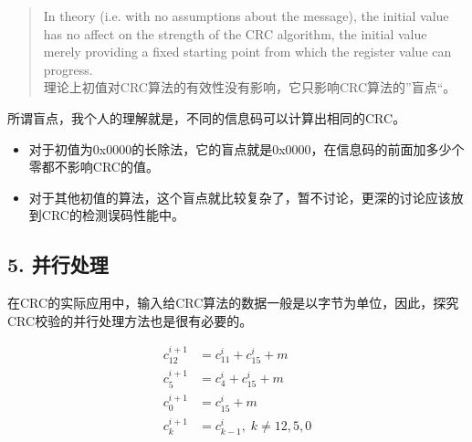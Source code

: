 \documentclass[
]{article}
\begin{document}
\begin{quote}
In theory (i.e. with no assumptions about the message), the initial
value has no affect on the strength of the CRC algorithm, the initial
value merely providing a fixed starting point from which the register
value can progress. \\
理论上初值对CRC算法的有效性没有影响，它只影响CRC算法的''盲点``。
\end{quote}

所谓盲点，我个人的理解就是，不同的信息码可以计算出相同的CRC。

\begin{itemize}
\item
  对于初值为0x0000的长除法，它的盲点就是0x0000，在信息码的前面加多少个零都不影响CRC的值。
\item
  对于其他初值的算法，这个盲点就比较复杂了，暂不讨论，更深的讨论应该放到CRC的检测误码性能中。
\end{itemize}


\newpage
\hypertarget{header-n485}{%
\subsection{5. 并行处理}\label{header-n485}}
在CRC的实际应用中，输入给CRC算法的数据一般是以字节为单位，因此，探究CRC校验的并行处理方法也是很有必要的。

\begin{equation}
\begin{aligned}
c_{12}^{i+1}&=c_{11}^{i}+c_{15}^i+m\\
c_{ 5}^{i+1}&=c_{ 4}^{i}+c_{15}^i+m\\
c_{ 0}^{i+1}&=c_{15}^i+m\\
c_{ k}^{i+1}&=c_{ k-1}^{i},\; k \neq 12,5,0 \\
\end{aligned}
\end{equation}
\end{document}
